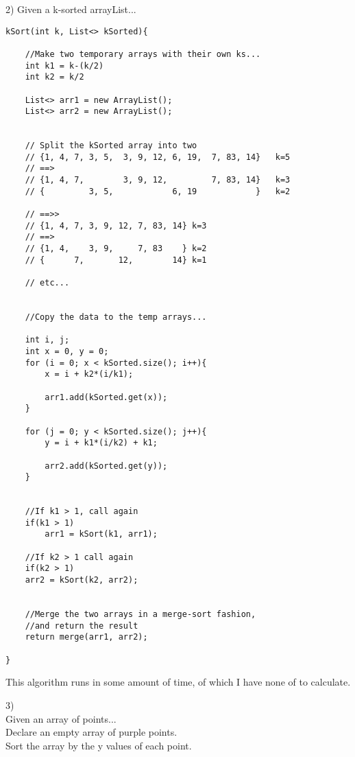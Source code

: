 \documentclass[12pt]{article}
\begin{document}
\pagebreak


2) Given a k-sorted arrayList...\\
\begin{lstlisting}[label=some-code]
kSort(int k, List<> kSorted){

    //Make two temporary arrays with their own ks...
    int k1 = k-(k/2)
    int k2 = k/2
    
    List<> arr1 = new ArrayList();
    List<> arr2 = new ArrayList();
    
    
    // Split the kSorted array into two
    // {1, 4, 7, 3, 5,  3, 9, 12, 6, 19,  7, 83, 14}   k=5 
    // ==>
    // {1, 4, 7,        3, 9, 12,         7, 83, 14}   k=3
    // {         3, 5,            6, 19            }   k=2
    
    // ==>>
    // {1, 4, 7, 3, 9, 12, 7, 83, 14} k=3
    // ==>
    // {1, 4,    3, 9,     7, 83    } k=2
    // {      7,       12,        14} k=1
    
    // etc...


    //Copy the data to the temp arrays...
    
    int i, j;
    int x = 0, y = 0;
    for (i = 0; x < kSorted.size(); i++){
        x = i + k2*(i/k1);

        arr1.add(kSorted.get(x));
    }

    for (j = 0; y < kSorted.size(); j++){
        y = i + k1*(i/k2) + k1;

        arr2.add(kSorted.get(y));
    }
    
    
    //If k1 > 1, call again
    if(k1 > 1)
    	arr1 = kSort(k1, arr1);
    
    //If k2 > 1 call again
    if(k2 > 1)
	arr2 = kSort(k2, arr2);
    
    
    //Merge the two arrays in a merge-sort fashion,
    //and return the result
    return merge(arr1, arr2);
    
}
\end{lstlisting}
This algorithm runs in some amount of time, of which I have none of to calculate.\\

\pagebreak

3) \\
Given an array of points...\\
Declare an empty array of purple points.\\

\noindent Sort the array by the y values of each point.\\
\end{document}
